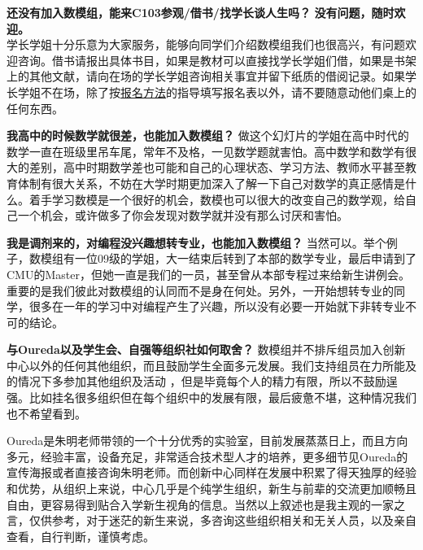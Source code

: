 \documentclass[presentation]{beamer}
\begin{document}
\begin{CJK*}{UTF8}{gbsn}
\begin{frame}
\begin{block}{\textbf{还没有加入数模组，能来C103参观/借书/找学长谈人生吗？}}
\textbf{没有问题，随时欢迎。}\\
学长学姐十分乐意为大家服务，能够向同学们介绍数模组我们也很高兴，有问题欢迎咨询。借书请报出具体书目，如果是教材可以直接找学长学姐们借，如果是书架上的其他文献，请向在场的学长学姐咨询相关事宜并留下纸质的借阅记录。如果学长学姐不在场，除了按\textcolor{blue}{\hyperlink{signin}{报名方法}}的指导填写报名表以外，请不要随意动他们桌上的任何东西。

\end{block}
\end{frame}

\begin{frame}
\begin{block}{\textbf{我高中的时候数学就很差，也能加入数模组？}}
做这个幻灯片的学姐在高中时代的数学一直在班级里吊车尾，常年不及格，一见数学题就害怕。高中数学和数学有很大的差别，高中时期数学差也可能和自己的心理状态、学习方法、教师水平甚至教育体制有很大关系，不妨在大学时期更加深入了解一下自己对数学的真正感情是什么。着手学习数模是一个很好的机会，数模也可以很大的改变自己的数学观，给自己一个机会，或许做多了你会发现对数学就并没有那么讨厌和害怕。
\end{block}
\begin{alertblock}{\textbf{我是调剂来的，对编程没兴趣想转专业，也能加入数模组？}}
当然可以。举个例子，数模组有一位09级的学姐，大一结束后转到了本部的数学专业，最后申请到了CMU的Master，但她一直是我们的一员，甚至曾从本部专程过来给新生讲例会。重要的是我们彼此对数模组的认同而不是身在何处。另外，一开始想转专业的同学，很多在一年的学习中对编程产生了兴趣，所以没有必要一开始就下非转专业不可的结论。
\end{alertblock}
\end{frame}

\begin{frame}
    \begin{exampleblock}{\textbf{与Oureda以及学生会、自强等组织社如何取舍？}}
    数模组并不排斥组员加入创新中心以外的任何其他组织，而且鼓励学生全面多元发展。我们支持组员在力所能及的情况下多参加其他组织及活动 ，但是毕竟每个人的精力有限，所以不鼓励逞强。比如挂名很多组织但在每个组织中的发展有限，最后疲惫不堪，这种情况我们也不希望看到。
    
    Oureda是朱明老师带领的一个十分优秀的实验室，目前发展蒸蒸日上，而且方向多元，经验丰富，设备充足，非常适合技术型人才的培养，更多细节见Oureda的宣传海报或者直接咨询朱明老师。而创新中心同样在发展中积累了得天独厚的经验和优势，从组织上来说，中心几乎是个纯学生组织，新生与前辈的交流更加顺畅且自由，更容易得到贴合入学新生视角的信息。当然以上叙述也是我主观的一家之言，仅供参考，对于迷茫的新生来说，多咨询这些组织相关和无关人员，以及亲自查看，自行判断，谨慎考虑。
    

\end{exampleblock}
\end{frame}
\end{CJK*}
\end{document}
